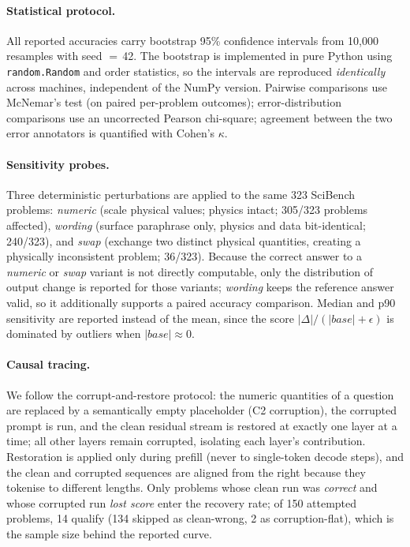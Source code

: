 \paragraph{Statistical protocol.}
All reported accuracies carry bootstrap 95\% confidence intervals from
10{,}000 resamples with seed $=$\,42. The bootstrap is implemented in pure
Python using \texttt{random.Random} and order statistics, so the intervals are
reproduced \emph{identically} across machines, independent of the NumPy
version. Pairwise comparisons use McNemar's test (on paired per-problem
outcomes); error-distribution comparisons use an uncorrected Pearson
chi-square; agreement between the two error annotators is quantified with
Cohen's $\kappa$.

\paragraph{Sensitivity probes.}
Three deterministic perturbations are applied to the same 323 SciBench
problems: \emph{numeric} (scale physical values; physics intact; 305/323
problems affected), \emph{wording} (surface paraphrase only, physics and data
bit-identical; 240/323), and \emph{swap} (exchange two distinct physical
quantities, creating a physically inconsistent problem; 36/323). Because the
correct answer to a \emph{numeric} or \emph{swap} variant is not directly
computable, only the distribution of output change is reported for those
variants; \emph{wording} keeps the reference answer valid, so it additionally
supports a paired accuracy comparison. Median and p90 sensitivity are reported
instead of the mean, since the score $|\Delta|/(|base|+\epsilon)$ is dominated
by outliers when $|base|\approx 0$.

\paragraph{Causal tracing.}
We follow the corrupt-and-restore protocol: the numeric quantities of a question
are replaced by a semantically empty placeholder (C2 corruption), the corrupted
prompt is run, and the clean residual stream is restored at exactly one layer
at a time; all other layers remain corrupted, isolating each layer's
contribution. Restoration is applied only during prefill (never to single-token
decode steps), and the clean and corrupted sequences are aligned from the right
because they tokenise to different lengths. Only problems whose clean run was
\emph{correct} and whose corrupted run \emph{lost score} enter the recovery
rate; of 150 attempted problems, 14 qualify (134 skipped as clean-wrong,
2 as corruption-flat), which is the sample size behind the reported curve.

